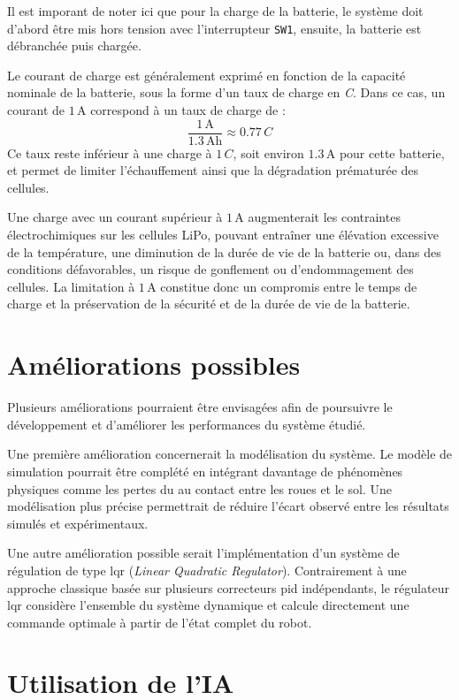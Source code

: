 Il est imporant de noter ici que pour la charge de la batterie, le système doit d'abord être mis hors tension avec l'interrupteur \texttt{SW1}, ensuite, la batterie est débranchée puis chargée.

Le courant de charge est généralement exprimé en fonction de la capacité nominale de la batterie, sous la forme d'un taux de charge en \emph{C}. Dans ce cas, un courant de $1\,\mathrm{A}$ correspond à un taux de charge de :
\[
\frac{1\,\mathrm{A}}{1.3\,\mathrm{Ah}} \approx 0.77\,C
\]
Ce taux reste inférieur à une charge à $1\,C$, soit environ $1.3\,\mathrm{A}$ pour cette batterie, et permet de limiter l'échauffement ainsi que la dégradation prématurée des cellules.

Une charge avec un courant supérieur à $1\,\mathrm{A}$ augmenterait les contraintes électrochimiques sur les cellules LiPo, pouvant entraîner une élévation excessive de la température, une diminution de la durée de vie de la batterie ou, dans des conditions défavorables, un risque de gonflement ou d'endommagement des cellules. La limitation à $1\,\mathrm{A}$ constitue donc un compromis entre le temps de charge et la préservation de la sécurité et de la durée de vie de la batterie.


\section{Améliorations possibles}

Plusieurs améliorations pourraient être envisagées afin de poursuivre le développement et d'améliorer les performances du système étudié.

Une première amélioration concernerait la modélisation du système. Le modèle de simulation pourrait être complété en intégrant davantage de phénomènes physiques comme les pertes du au contact entre les roues et le sol. Une modélisation plus précise permettrait de réduire l'écart observé entre les résultats simulés et expérimentaux.

Une autre amélioration possible serait l'implémentation d'un système de régulation de type \acrshort{lqr} (\textit{Linear Quadratic Regulator}). Contrairement à une approche classique basée sur plusieurs correcteurs \acrshort{pid} indépendants, le régulateur \acrshort{lqr} considère l'ensemble du système dynamique et calcule directement une commande optimale à partir de l'état complet du robot.

\section{Utilisation de l'IA}

